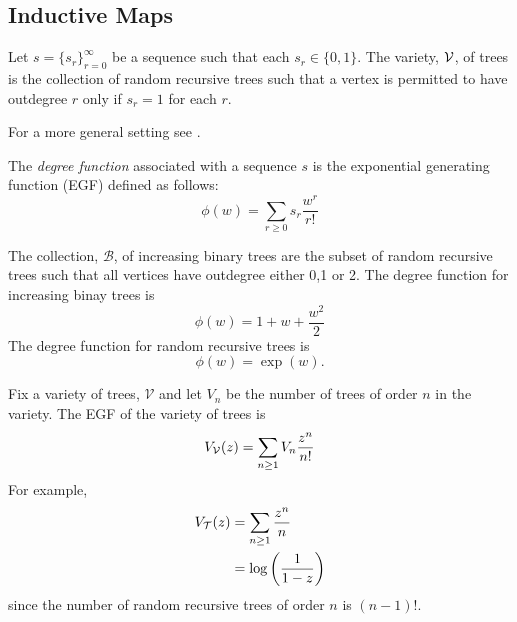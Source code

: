 \subsection{Inductive Maps}
\begin{defn}
 Let $s = \{ s_r\}_{r=0}^{\infty}$ be a sequence such that each $s_r \in \{0,1\}$.  The variety, $\operatorname{\mathcal{V}}$, of trees is the 
 collection of random recursive trees such that a vertex is permitted to have outdegree $r$ only if $s_r = 1$ for each $r$. 
\end{defn}
\begin{remk}
 For a more general setting see \cite{Bergeron}.
\end{remk}
The \emph{degree function} associated with a sequence $s$ is the exponential generating function (EGF) defined as follows:
\[
 \phi(w) = \sum_{r \geq 0} s_r \frac{w^r}{r!}
\]

\begin{ex}
 The collection, $\mathcal{B}$, of increasing binary trees are the subset of random recursive trees such that all vertices 
 have outdegree either 0,1 or 2.  The degree function for increasing binay trees is
 \[
  \phi(w) = 1 + w + \frac{w^2}{2}
 \]
The degree function for random recursive trees is
\[
 \phi(w) = \exp(w).
\]
\end{ex}
Fix a variety of trees, $\mathcal{V}$ and let $V_n$ be the number of trees of order $n$ in the variety.  The EGF of the variety of trees 
is 
\[
 V_{\operatorname{\mathcal{V}}}(z) = \sum_{n \geq 1} V_n \frac{z^n}{n!}
\]
For example, 
\begin{align}
V_{\operatorname{\mathcal{T}}}(z) &= \sum_{n\geq 1} \frac{z^n}{n} \\
&= \log\left( \frac{1}{1-z}\right)
\end{align}
since the number of random recursive trees of order $n$ is $(n-1)!$.

